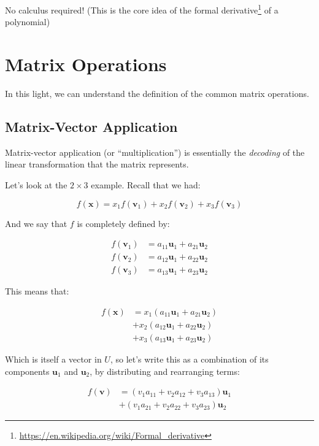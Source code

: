 \documentclass[]{article}
\renewcommand{\href}[2]{#2\footnote{\url{#1}}}
\begin{document}
No calculus required! (This is the core idea of the
\href{https://en.wikipedia.org/wiki/Formal_derivative}{formal derivative} of a
polynomial)

\section{Matrix Operations}\label{matrix-operations}

In this light, we can understand the definition of the common matrix operations.

\subsection{Matrix-Vector Application}\label{matrix-vector-application}

Matrix-vector application (or ``multiplication'') is essentially the
\emph{decoding} of the linear transformation that the matrix represents.

Let's look at the \(2 \times 3\) example. Recall that we had:

\[
f(\mathbf{x}) = x_1 f(\mathbf{v}_1) + x_2 f(\mathbf{v}_2) + x_3 f(\mathbf{v}_3)
\]

And we say that \(f\) is completely defined by:

\[
\begin{aligned}
f(\mathbf{v}_1) & = a_{11} \mathbf{u}_1 + a_{21} \mathbf{u}_2 \\
f(\mathbf{v}_2) & = a_{12} \mathbf{u}_1 + a_{22} \mathbf{u}_2 \\
f(\mathbf{v}_3) & = a_{13} \mathbf{u}_1 + a_{23} \mathbf{u}_2
\end{aligned}
\]

This means that:

\[
\begin{aligned}
f(\mathbf{x}) & = x_1 (a_{11} \mathbf{u}_1 + a_{21} \mathbf{u}_2) \\
              & + x_2 (a_{12} \mathbf{u}_1 + a_{22} \mathbf{u}_2) \\
              & + x_3 (a_{13} \mathbf{u}_1 + a_{23} \mathbf{u}_2)
\end{aligned}
\]

Which is itself a vector in \(U\), so let's write this as a combination of its
components \(\mathbf{u}_1\) and \(\mathbf{u}_2\), by distributing and
rearranging terms:

\[
\begin{aligned}
f(\mathbf{v}) & = (v_1 a_{11} + v_2 a_{12} + v_3 a_{13}) \mathbf{u}_1 \\
              & + (v_1 a_{21} + v_2 a_{22} + v_3 a_{23}) \mathbf{u}_2
\end{aligned}
\]
\end{document}
